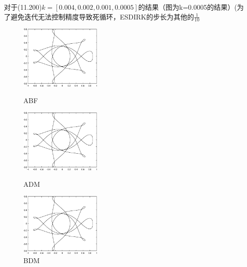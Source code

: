 \documentclass[12]{article}%
\begin{document}
对于(11.200)$k=[0.004,0.002,0.001,0.0005]$的结果（图为k=0.0005的结果）(为了避免迭代无法控制精度导致死循环，ESDIRK的步长为其他的$\frac{1}{10}$
\begin{figure}[H]
    \centering
    \begin{minipage}[t]{0.3\textwidth}
    \centering
    \includegraphics[width=4cm]{../pic/ABF.eps}
    \caption{ABF}
    \end{minipage}
    \begin{minipage}[t]{0.3\textwidth}
    \centering
    \includegraphics[width=4cm]{../pic/ADM.eps}
    \caption{ADM}
    \end{minipage}
    \begin{minipage}[t]{0.3\textwidth}
    \centering
    \includegraphics[width=4cm]{../pic/BDF.eps}
    \caption{BDM}
    \end{minipage}
\end{figure}
\end{document}

